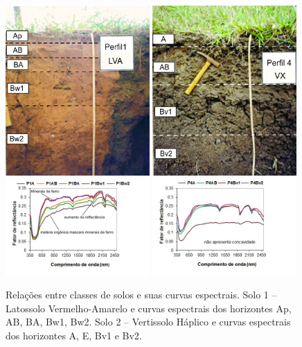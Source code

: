 \begin{figure}[tb!]
\begin{minipage}[t]{1\linewidth}
   \centering
   \includegraphics[width=0.49\textwidth]{figuras/lva.jpg}
   \includegraphics[width=0.49\textwidth]{figuras/vertissolo.jpg}
   \includegraphics[width=0.49\textwidth, trim=0.5cm 0cm 1.5cm 0cm, clip]{figuras/curvas-lva.jpg}
   \includegraphics[width=0.49\textwidth, trim=0.5cm 0cm 1.5cm 0cm, clip]{figuras/curvas-vertissolo.jpg}
   \caption{Relações entre classes de solos e suas curvas espectrais. Solo 1 -- Latossolo Vermelho-Amarelo e curvas espectrais dos horizontes Ap, AB, BA, Bw1, Bw2. Solo 2 -- Vertissolo Háplico e curvas espectrais dos horizontes A, E, Bv1 e Bv2.}
   \label{fig:curvas}
\end{minipage}
\end{figure}

